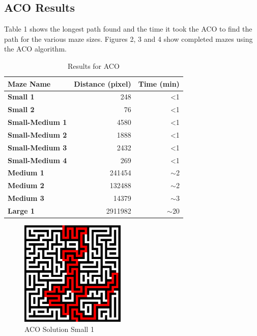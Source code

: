 \documentclass[conference]{IEEEtran}
\begin{document}
    \subsection{ACO Results}
        Table 1 shows the longest path found and the time it took the ACO to find the path for the various maze sizes.
        Figures 2, 3 and 4 show completed mazes using the ACO algorithm.
\begin{table}[h]
\begin{tabular}{|l|r|r|}
\hline
\textbf{Maze Name}      & \multicolumn{1}{l|}{\textbf{Distance (pixel)}} & \multicolumn{1}{l|}{\textbf{Time (min)}} \\ \hline
\textbf{Small 1}        & 248                                            & \textless 1                              \\ \hline
\textbf{Small 2}        & 76                                             & \textless 1                              \\ \hline
\textbf{Small-Medium 1} & 4580                                           & \textless 1                              \\ \hline
\textbf{Small-Medium 2} & 1888                                           & \textless 1                              \\ \hline
\textbf{Small-Medium 3} & 2432                                           & \textless 1                              \\ \hline
\textbf{Small-Medium 4} & 269                                            & \textless 1                              \\ \hline
\textbf{Medium 1}       & 241454                                         & $\sim$2                                 \\ \hline
\textbf{Medium 2}       & 132488                                         & $\sim$2                                 \\ \hline
\textbf{Medium 3}       & 14379                                          & $\sim$3                                  \\ \hline
\textbf{Large 1}        & 2911982                                        & $\sim$20                                    \\ \hline
\end{tabular}
\caption{Results for ACO}
\label{ACO}
\end{table}
        \begin{figure}[H]
            \centering
            \includegraphics[width=5cm]{images/ACO_Small1.png}
            \caption{ACO Solution Small 1}
            \label{ACO_Small1}
        \end{figure}
\end{document}
